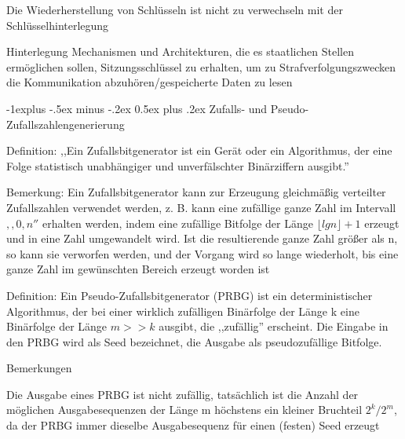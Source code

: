 \documentclass[a4paper]{article}
\makeatletter
\renewcommand{\subsection}{\@startsection{subsection}{2}{0mm}%
 {-1explus -.5ex minus -.2ex}%
 {0.5ex plus .2ex}%
 {\normalfont\normalsize\bfseries}}
\makeatother
\begin{document}
\begin{multicols}{3}
\begin{description*}
\begin{itemize*}
                  \item Die Wiederherstellung von Schlüsseln ist nicht zu verwechseln mit der Schlüsselhinterlegung
            \end{itemize*}
            \item[Hinterlegung] Mechanismen und Architekturen, die es staatlichen Stellen ermöglichen sollen, Sitzungsschlüssel zu erhalten, um zu Strafverfolgungszwecken die Kommunikation abzuhören/gespeicherte Daten zu lesen
      \end{description*}

      \subsection{Zufalls- und Pseudo-Zufallszahlengenerierung}
      \begin{itemize*}
            \item Definition: ,,Ein Zufallsbitgenerator ist ein Gerät oder ein Algorithmus, der eine Folge statistisch unabhängiger und unverfälschter Binärziffern ausgibt.''
            \item Bemerkung: Ein Zufallsbitgenerator kann zur Erzeugung gleichmäßig verteilter Zufallszahlen verwendet werden, z. B. kann eine zufällige ganze Zahl im Intervall $,,0,n''$ erhalten werden, indem eine zufällige Bitfolge der Länge $\lfloor lg n\rfloor+1$ erzeugt und in eine Zahl umgewandelt wird. Ist die resultierende ganze Zahl größer als n, so kann sie verworfen werden, und der Vorgang wird so lange wiederholt, bis eine ganze Zahl im gewünschten Bereich erzeugt worden ist
            \item Definition: Ein Pseudo-Zufallsbitgenerator (PRBG) ist ein deterministischer Algorithmus, der bei einer wirklich zufälligen Binärfolge der Länge k eine Binärfolge der Länge $m>> k$ ausgibt, die ,,zufällig'' erscheint. Die Eingabe in den PRBG wird als Seed bezeichnet, die Ausgabe als pseudozufällige Bitfolge.
            \item Bemerkungen
            \begin{itemize*}
                  \item Die Ausgabe eines PRBG ist nicht zufällig, tatsächlich ist die Anzahl der möglichen Ausgabesequenzen der Länge m höchstens ein kleiner Bruchteil $2^k/2^m$, da der PRBG immer dieselbe Ausgabesequenz für einen (festen) Seed erzeugt

\end{itemize*}
\end{itemize*}
\end{multicols}
\end{document}
